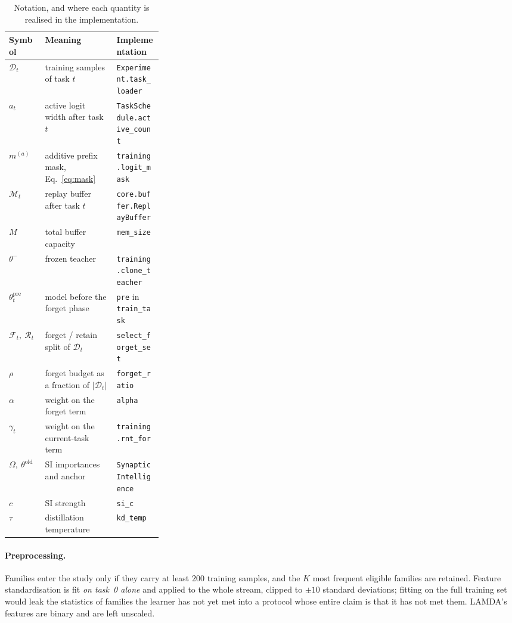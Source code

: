\begin{table}[t]
  \centering
  \small
  \caption{Notation, and where each quantity is realised in the implementation.}
  \label{tab:notation}
  \begin{tabular}{@{}llp{0.30\linewidth}@{}}
    \toprule
    Symbol & Meaning & Implementation \\
    \midrule
    $\mathcal{D}_t$ & training samples of task $t$ & \texttt{Experiment.task\_loader} \\
    $a_t$ & active logit width after task $t$ & \texttt{TaskSchedule.active\_count} \\
    $m^{(a)}$ & additive prefix mask, Eq.~\eqref{eq:mask} & \texttt{training.logit\_mask} \\
    $\mathcal{M}_t$ & replay buffer after task $t$ & \texttt{core.buffer.ReplayBuffer} \\
    $M$ & total buffer capacity & \texttt{mem\_size} \\
    $\theta^{-}$ & frozen teacher & \texttt{training.clone\_teacher} \\
    $\theta^{\text{pre}}_t$ & model before the forget phase & \texttt{pre} in \texttt{train\_task} \\
    $\mathcal{F}_t,\ \mathcal{R}_t$ & forget / retain split of $\mathcal{D}_t$ & \texttt{select\_forget\_set} \\
    $\rho$ & forget budget as a fraction of $|\mathcal{D}_t|$ & \texttt{forget\_ratio} \\
    $\alpha$ & weight on the forget term & \texttt{alpha} \\
    $\gamma_t$ & weight on the current-task term & \texttt{training.rnt\_for} \\
    $\Omega,\ \theta^{\text{old}}$ & SI importances and anchor & \texttt{SynapticIntelligence} \\
    $c$ & SI strength & \texttt{si\_c} \\
    $\tau$ & distillation temperature & \texttt{kd\_temp} \\
    \bottomrule
  \end{tabular}
\end{table}

\paragraph{Preprocessing.}
Families enter the study only if they carry at least $200$ training samples, and
the $K$ most frequent eligible families are retained. Feature standardisation is
fit \emph{on task~0 alone} and applied to the whole stream, clipped to
$\pm 10$ standard deviations; fitting on the full training set would leak the
statistics of families the learner has not yet met into a protocol whose entire
claim is that it has not met them. LAMDA's features are binary and are left
unscaled.

